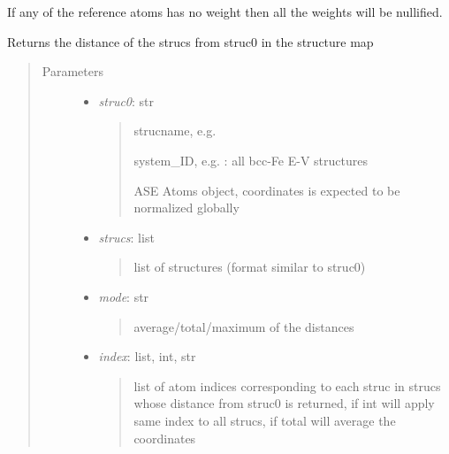\documentclass[letterpaper,10pt,english]{sphinxmanual}
\begin{document}
\begin{fulllineitems}
\begin{fulllineitems}
If any of the reference atoms has no weight then all the weights
will be nullified.

\end{fulllineitems}


\begin{fulllineitems}
\label{classes:catdata.CATData.get_structuremap_distance}
Returns the distance of the strucs from struc0 in the 
structure map
\begin{quote}\begin{description}
\item[{Parameters}] \leavevmode\begin{itemize}
\item {} 
\emph{struc0}: str
\begin{quote}

strucname,  e.g. 

system\_ID, e.g.  : all bcc-Fe E-V structures

ASE Atoms object, coordinates is expected to be normalized
globally
\end{quote}

\item {} 
\emph{strucs}: list
\begin{quote}

list of structures (format similar to struc0)
\end{quote}

\item {} 
\emph{mode}: str
\begin{quote}

average/total/maximum of the distances
\end{quote}

\item {} 
\emph{index}: list, int, str
\begin{quote}

list of atom indices corresponding to each struc in strucs
whose distance from struc0 is returned, if int will apply 
same index to all strucs, if total will average the coordinates
\end{quote}

\end{itemize}

\end{description}\end{quote}


\end{fulllineitems}
\end{fulllineitems}
\end{document}
